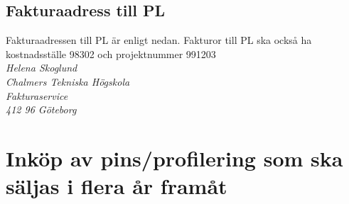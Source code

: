 \documentclass{article}
\newcommand\tab[1][1cm]{\hspace*{#1}}
\begin{document}
\subsection{Fakturaadress till PL}
\label{sec:pl-fakturaadress}
Fakturaadressen till PL är enligt nedan. Fakturor till PL ska också ha kostnadsställe 98302 och projektnummer 991203 \\

\textit{
\tab[0.3cm]Helena Skoglund \\
\tab Chalmers Tekniska Högskola \\
\tab Fakturaservice\\
\tab 412 96 Göteborg}

\section{Inköp av pins/profilering som ska säljas i flera år framåt}
\end{document}
